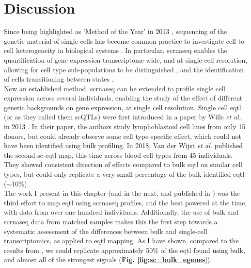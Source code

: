 
\section{Discussion}

Since being highlighted as `Method of the Year' in 2013 \cite{editorial2014method}, sequencing of the genetic material of single cells has become common-practice to investigate cell-to-cell heterogeneity in biological systems \cite{lahnemann2020eleven}. 
In particular, 
\gls{scrnaseq}
enables the quantification of gene expression  transcriptome-wide, and at single-cell resolution, allowing for cell type sub-populations to be distinguished \cite{anchang2016visualization, young2018single, muraro2016single, ernst2019staged, pijuan2019single, velten2017human},
and the identification of cells transitioning between states \cite{la2018rna, buettner2015computational, trapnell2014dynamics, bendall2014single, moignard2015decoding}. \\

Now an established method, \gls{scrnaseq} can be extended to profile single cell expression across several individuals, enabling the study of the effect of different genetic backgrounds on gene expression, at single cell resolution.
Single cell \gls{eqtl} (or as they called them scQTLs) were first introduced in a paper by Wills \textit{et al.}, in 2013 \cite{wills2013single}.
In their paper, the authors study lymphoblastoid cell lines from only 15 donors, but could already observe some cell type-specific effect, which could not have been identified using bulk profiling.
In 2018, Van der Wijst \textit{et al.} \cite{van2018single} published the second sc-\gls{eqtl} map, this time across blood cell types from 45 individuals.
They showed consistent direction of effects compared to bulk \gls{eqtl} on similar cell types, but could only replicate a very small percentage of the bulk-identified \gls{eqtl} ($\sim$10\%). \\

The work I present in this chapter (and in the next, and published in \cite{cuomo2020single}) was the third effort to map \gls{eqtl} using \gls{scrnaseq} profiles, and the best powered at the time, with data from over one hundred individuals.
Additionally, the use of bulk and \gls{scrnaseq} data from matched samples makes this the first step towards a systematic assessment of the differences between bulk and single-cell transcriptomics, as applied to \gls{eqtl} mapping.
As I have shown, compared to the results from \cite{van2018single}, we could replicate approximately 50\% of the \gls{eqtl} found using bulk, and almost all of the strongest signals (\textbf{Fig. \ref{fig:sc_bulk_egenes}}). \\

